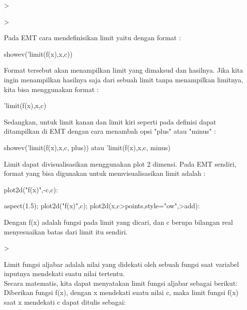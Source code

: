 \documentclass[a4paper,10pt]{article}
\begin{document}
\begin{eulernotebook}
\begin{eulercomment}
\begin{eulercomment}
\begin{eulercomment}
\begin{eulercomment}
\begin{eulercomment}
\begin{eulercomment}
\begin{eulerudf}
\end{eulerudf}
\begin{eulerprompt}
>    
\end{eulerprompt}
\begin{eulerudf}
   
\end{eulerudf}
\begin{eulerprompt}
> 
\end{eulerprompt}
\begin{eulercomment}
Pada EMT cara mendefinisikan limit yaitu dengan format :

\textdollar{}showev('limit(f(x),x,c))

Format tersebut akan menampilkan limit yang dimaksud dan hasilnya.
Jika kita ingin menampilkan hasilnya saja dari sebuah limit tanpa
menampilkan limitnya, kita bisa menggunakan format :

'limit(f(x),x,c)

Sedangkan, untuk limit kanan dan limit kiri seperti pada definisi
dapat ditampilkan di EMT dengan cara menambah opsi "plus" atau "minus"
:

\textdollar{}showev('limit(f(x),x,c, plus)) atau 'limit(f(x),x,c, minus)

Limit dapat divisualisasikan menggunakan plot 2 dimensi. Pada EMT
sendiri, format yang bisa digunakan untuk memvisualisasikan limit
adalah :

plot2d("f(x)",-c,c):

aspect(1.5); plot2d("f(x)",c); plot2d(x,c\textgreater{}points,style="ow",\textgreater{}add):

Dengan f(x) adalah fungsi pada limit yang dicari, dan c berupa
bilangan real menyesuaikan batas dari limit itu sendiri.
\end{eulercomment}
\begin{eulerprompt}
>               
\end{eulerprompt}
\begin{eulercomment}
Limit fungsi aljabar adalah nilai yang didekati oleh sebuah fungsi
saat variabel inputnya mendekati suatu nilai tertentu.\\
Secara matematis, kita dapat menyatakan limit fungsi aljabar sebagai
berikut:\\
Diberikan fungsi f(x), dengan x mendekati suatu nilai c, maka limit
fungsi f(x) saat x mendekati c dapat ditulis sebagai:


\end{eulercomment}
\end{eulercomment}
\end{eulercomment}
\end{eulercomment}
\end{eulercomment}
\end{eulercomment}
\end{eulercomment}
\end{eulernotebook}
\end{document}
